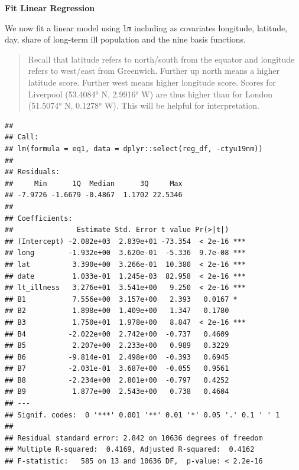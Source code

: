 \documentclass[
]{book}
\newenvironment{Shaded}{\begin{snugshade}}{\end{snugshade}}
\newcommand{\DataTypeTok}[1]{\textcolor[rgb]{0.13,0.29,0.53}{#1}}
\newcommand{\KeywordTok}[1]{\textcolor[rgb]{0.13,0.29,0.53}{\textbf{#1}}}
\newcommand{\NormalTok}[1]{#1}
\newcommand{\OperatorTok}[1]{\textcolor[rgb]{0.81,0.36,0.00}{\textbf{#1}}}
\newcommand{\StringTok}[1]{\textcolor[rgb]{0.31,0.60,0.02}{#1}}
\begin{document}
\textbf{Fit Linear Regression}

We now fit a linear model using \texttt{lm} including as covariates longitude, latitude, day, share of long-term ill population and the nine basis functions.

\begin{quote}
Recall that latitude refers to north/south from the equator and longitude refers to west/east from Greenwich. Further up north means a higher latitude score. Further west means higher longitude score. Scores for Liverpool (53.4084° N, 2.9916° W) are thus higher than for London (51.5074° N, 0.1278° W). This will be helpful for interpretation.
\end{quote}

\begin{Shaded}
\end{Shaded}

\begin{verbatim}
## 
## Call:
## lm(formula = eq1, data = dplyr::select(reg_df, -ctyu19nm))
## 
## Residuals:
##     Min      1Q  Median      3Q     Max 
## -7.9726 -1.6679 -0.4867  1.1702 22.5346 
## 
## Coefficients:
##               Estimate Std. Error t value Pr(>|t|)    
## (Intercept) -2.082e+03  2.839e+01 -73.354  < 2e-16 ***
## long        -1.932e+00  3.620e-01  -5.336  9.7e-08 ***
## lat          3.390e+00  3.266e-01  10.380  < 2e-16 ***
## date         1.033e-01  1.245e-03  82.958  < 2e-16 ***
## lt_illness   3.276e+01  3.541e+00   9.250  < 2e-16 ***
## B1           7.556e+00  3.157e+00   2.393   0.0167 *  
## B2           1.898e+00  1.409e+00   1.347   0.1780    
## B3           1.750e+01  1.978e+00   8.847  < 2e-16 ***
## B4          -2.022e+00  2.742e+00  -0.737   0.4609    
## B5           2.207e+00  2.233e+00   0.989   0.3229    
## B6          -9.814e-01  2.498e+00  -0.393   0.6945    
## B7          -2.031e-01  3.687e+00  -0.055   0.9561    
## B8          -2.234e+00  2.801e+00  -0.797   0.4252    
## B9           1.877e+00  2.543e+00   0.738   0.4604    
## ---
## Signif. codes:  0 '***' 0.001 '**' 0.01 '*' 0.05 '.' 0.1 ' ' 1
## 
## Residual standard error: 2.842 on 10636 degrees of freedom
## Multiple R-squared:  0.4169, Adjusted R-squared:  0.4162 
## F-statistic:   585 on 13 and 10636 DF,  p-value: < 2.2e-16
\end{verbatim}
\end{document}
